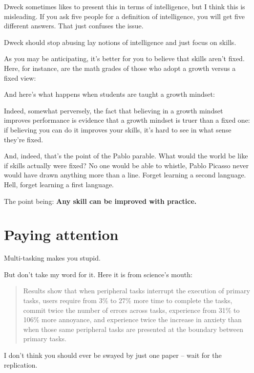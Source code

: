 Dweck sometimes likes to present this in terms of intelligence, but I think this
is misleading. If you ask five people for a definition of intelligence, you will
get five different answers. That just confuses the issue.

Dweck should stop abusing lay notions of intelligence and just focus on skills.

As you may be anticipating, it's better for you to believe that skills aren't
fixed. Here, for instance, are the math grades of those who adopt a growth
versus a fixed view:


And here's what happens when students are taught a growth mindset:


Indeed, somewhat perversely, the fact that believing in a growth mindset
improves performance is evidence that a growth mindset is truer than a fixed
one: if believing you can do it improves your skills, it's hard to see in what
sense they're fixed.

And, indeed, that's the point of the Pablo parable. What would the world be like
if skills actually were fixed? No one would be able to whistle, Pablo Picasso
never would have drawn anything more than a line. Forget learning a second
language. Hell, forget learning a first language.

The point being: \textbf{Any skill can be improved with practice.}

\section{Paying attention}

Multi-tasking makes you stupid.

But don't take my word for it. Here it is from science's mouth:

\begin{quote}
Results show that when peripheral tasks interrupt the execution of primary
tasks, users require from 3\% to 27\% more time to complete the tasks, commit
twice the number of errors across tasks, experience from 31\% to 106\% more
annoyance, and experience twice the increase in anxiety than when those same
peripheral tasks are presented at the boundary between primary tasks.\cite{bailey2006need}
\end{quote}

I don't think you should ever be swayed by just one paper -- wait for the
replication.


